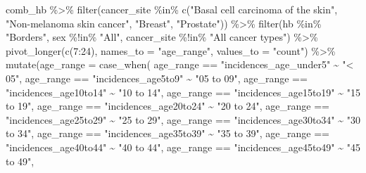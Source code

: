 \documentclass[
]{article}
\newenvironment{Shaded}{\begin{snugshade}}{\end{snugshade}}
\newcommand{\AttributeTok}[1]{\textcolor[rgb]{0.77,0.63,0.00}{#1}}
\newcommand{\DecValTok}[1]{\textcolor[rgb]{0.00,0.00,0.81}{#1}}
\newcommand{\FunctionTok}[1]{\textcolor[rgb]{0.00,0.00,0.00}{#1}}
\newcommand{\NormalTok}[1]{#1}
\newcommand{\SpecialCharTok}[1]{\textcolor[rgb]{0.00,0.00,0.00}{#1}}
\newcommand{\StringTok}[1]{\textcolor[rgb]{0.31,0.60,0.02}{#1}}
\begin{document}
\begin{Shaded}
\begin{Highlighting}[]
\NormalTok{comb\_hb }\SpecialCharTok{\%\textgreater{}\%} 
  \FunctionTok{filter}\NormalTok{(cancer\_site }\SpecialCharTok{\%in\%} \FunctionTok{c}\NormalTok{(}\StringTok{"Basal cell carcinoma of the skin"}\NormalTok{, }
                            \StringTok{"Non{-}melanoma skin cancer"}\NormalTok{,}
                            \StringTok{"Breast"}\NormalTok{,}
                            \StringTok{"Prostate"}\NormalTok{)) }\SpecialCharTok{\%\textgreater{}\%}
  \FunctionTok{filter}\NormalTok{(hb }\SpecialCharTok{\%in\%} \StringTok{"Borders"}\NormalTok{,}
\NormalTok{         sex }\SpecialCharTok{\%!in\%} \StringTok{"All"}\NormalTok{,}
\NormalTok{         cancer\_site }\SpecialCharTok{\%!in\%} \StringTok{"All cancer types"}\NormalTok{) }\SpecialCharTok{\%\textgreater{}\%} 
  \FunctionTok{pivot\_longer}\NormalTok{(}\FunctionTok{c}\NormalTok{(}\DecValTok{7}\SpecialCharTok{:}\DecValTok{24}\NormalTok{),}
               \AttributeTok{names\_to =} \StringTok{"age\_range"}\NormalTok{,}
               \AttributeTok{values\_to =} \StringTok{"count"}\NormalTok{) }\SpecialCharTok{\%\textgreater{}\%}
  \FunctionTok{mutate}\NormalTok{(}\AttributeTok{age\_range =} \FunctionTok{case\_when}\NormalTok{(}
\NormalTok{    age\_range }\SpecialCharTok{==} \StringTok{"incidences\_age\_under5"} \SpecialCharTok{\textasciitilde{}} \StringTok{"\textless{} 05"}\NormalTok{,}
\NormalTok{    age\_range }\SpecialCharTok{==} \StringTok{"incidences\_age5to9"} \SpecialCharTok{\textasciitilde{}} \StringTok{"05 to 09"}\NormalTok{,}
\NormalTok{    age\_range }\SpecialCharTok{==} \StringTok{"incidences\_age10to14"} \SpecialCharTok{\textasciitilde{}} \StringTok{"10 to 14"}\NormalTok{,}
\NormalTok{    age\_range }\SpecialCharTok{==} \StringTok{"incidences\_age15to19"} \SpecialCharTok{\textasciitilde{}} \StringTok{"15 to 19"}\NormalTok{,}
\NormalTok{    age\_range }\SpecialCharTok{==} \StringTok{"incidences\_age20to24"} \SpecialCharTok{\textasciitilde{}} \StringTok{"20 to 24"}\NormalTok{,}
\NormalTok{    age\_range }\SpecialCharTok{==} \StringTok{"incidences\_age25to29"} \SpecialCharTok{\textasciitilde{}} \StringTok{"25 to 29"}\NormalTok{,}
\NormalTok{    age\_range }\SpecialCharTok{==} \StringTok{"incidences\_age30to34"} \SpecialCharTok{\textasciitilde{}} \StringTok{"30 to 34"}\NormalTok{,}
\NormalTok{    age\_range }\SpecialCharTok{==} \StringTok{"incidences\_age35to39"} \SpecialCharTok{\textasciitilde{}} \StringTok{"35 to 39"}\NormalTok{,}
\NormalTok{    age\_range }\SpecialCharTok{==} \StringTok{"incidences\_age40to44"} \SpecialCharTok{\textasciitilde{}} \StringTok{"40 to 44"}\NormalTok{,}
\NormalTok{    age\_range }\SpecialCharTok{==} \StringTok{"incidences\_age45to49"} \SpecialCharTok{\textasciitilde{}} \StringTok{"45 to 49"}\NormalTok{,}

\end{Highlighting}
\end{Shaded}
\end{document}
